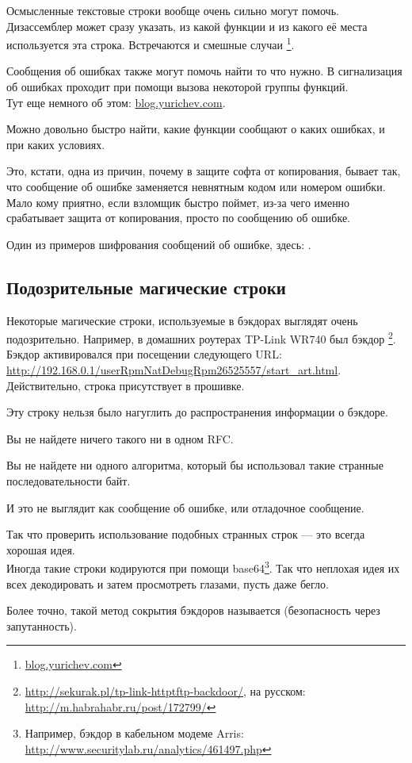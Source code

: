 Осмысленные текстовые строки вообще очень сильно могут помочь. 
Дизассемблер \IDA может сразу указать, из какой функции и из какого её места используется эта строка. 
Встречаются и смешные случаи
\footnote{\href{http://blog.yurichev.com/node/32}{blog.yurichev.com}}.

Сообщения об ошибках также могут помочь найти то что нужно. 
В \oracle сигнализация об ошибках проходит при помощи вызова некоторой группы функций. \\
Тут еще немного об этом: \href{http://blog.yurichev.com/node/43}{blog.yurichev.com}.

Можно довольно быстро найти, какие функции сообщают о каких ошибках, и при каких условиях.

Это, кстати, одна из причин, почему в защите софта от копирования, 
бывает так, что сообщение об ошибке заменяется 
невнятным кодом или номером ошибки. Мало кому приятно, если взломщик быстро поймет, 
из-за чего именно срабатывает защита от копирования, просто по сообщению об ошибке.

Один из примеров шифрования сообщений об ошибке, здесь: .

\subsection{Подозрительные магические строки}

Некоторые магические строки, используемые в бэкдорах выглядят очень подозрительно.
Например, в домашних роутерах TP-Link WR740 был бэкдор
\footnote{\url{http://sekurak.pl/tp-link-httptftp-backdoor/}, на русском: \url{http://m.habrahabr.ru/post/172799/}}.
Бэкдор активировался при посещении следующего URL:\\
\url{http://192.168.0.1/userRpmNatDebugRpm26525557/start_art.html}.\\
Действительно, строка  присутствует в прошивке.

Эту строку нельзя было нагуглить до распространения информации о бэкдоре.

Вы не найдете ничего такого ни в одном \ac{RFC}.

Вы не найдете ни одного алгоритма, который бы использовал такие странные последовательности байт.

И это не выглядит как сообщение об ошибке, или отладочное сообщение.

Так что проверить использование подобных странных строк --- это всегда хорошая идея.
\\
Иногда такие строки кодируются при помощи 
base64\footnote{Например, бэкдор в кабельном модеме Arris: 
\url{http://www.securitylab.ru/analytics/461497.php}}.
Так что неплохая идея их всех декодировать и затем просмотреть глазами, пусть даже бегло.
\\

Более точно, такой метод сокрытия бэкдоров называется  (безопасность через
запутанность).
